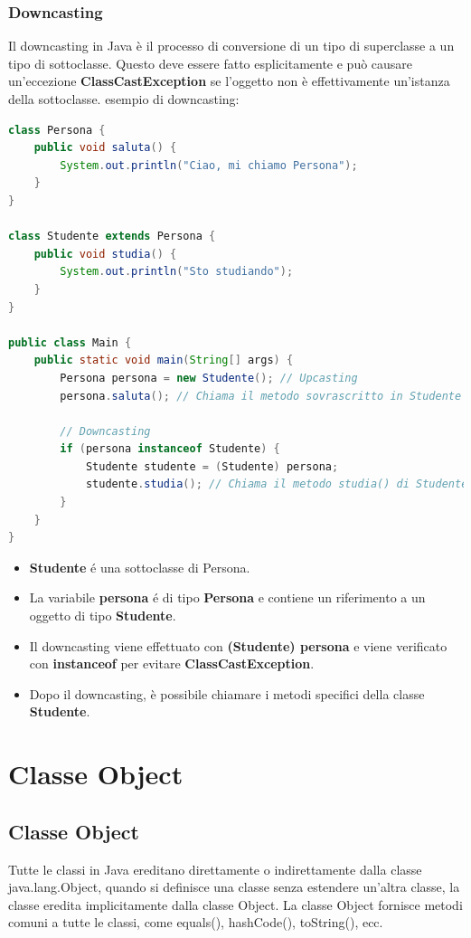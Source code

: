\documentclass[11pt]{article}
\begin{document}
\subsubsection{Downcasting}
Il downcasting in Java è il processo di conversione di un tipo di superclasse a un tipo di sottoclasse.
Questo deve essere fatto esplicitamente e può causare un'eccezione \textbf{ClassCastException} se l'oggetto non è effettivamente un'istanza della sottoclasse.
esempio di downcasting:
\begin{lstlisting}[language=Java]
    class Persona {
    public void saluta() {
        System.out.println("Ciao, mi chiamo Persona");
    }
}

class Studente extends Persona {
    public void studia() {
        System.out.println("Sto studiando");
    }
}

public class Main {
    public static void main(String[] args) {
        Persona persona = new Studente(); // Upcasting
        persona.saluta(); // Chiama il metodo sovrascritto in Studente

        // Downcasting
        if (persona instanceof Studente) {
            Studente studente = (Studente) persona;
            studente.studia(); // Chiama il metodo studia() di Studente
        }
    }
}
\end{lstlisting}
\begin{itemize}
    \item \textbf{Studente} é una sottoclasse di Persona.
    \item La variabile \textbf{persona} é di tipo \textbf{Persona} e contiene un riferimento a un oggetto di tipo \textbf{Studente}.
    \item Il downcasting viene effettuato con \textbf{(Studente) persona} e viene verificato con \textbf{instanceof} per evitare \textbf{ClassCastException}.
    \item Dopo il downcasting, è possibile chiamare i metodi specifici della classe \textbf{Studente}.
\end{itemize}
\section{Classe Object}
\subsection{Classe Object}
Tutte le classi in Java ereditano direttamente o indirettamente dalla classe java.lang.Object, quando si definisce una classe senza estendere un'altra classe, la classe eredita implicitamente dalla classe Object.
La classe Object fornisce metodi comuni a tutte le classi, come equals(), hashCode(), toString(), ecc.
\end{document}
